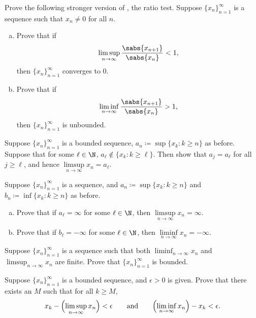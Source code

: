 \begin{exercise} \label{exercise:strongerratiotest2}
Prove the following stronger version of , the ratio
test.
Suppose $\{ x_n \}_{n=1}^\infty$ is a sequence such that $x_n \not= 0$ for all
$n$.
\begin{enumerate}[a)]
\item
Prove that if
\begin{equation*}
\limsup_{n \to \infty} \frac{\sabs{x_{n+1}}}{\sabs{x_n}} < 1 ,
\end{equation*}
then $\{ x_n \}_{n=1}^\infty$ converges to $0$.
\item
Prove that if
\begin{equation*}
\liminf_{n \to \infty} \frac{\sabs{x_{n+1}}}{\sabs{x_n}} > 1 ,
\end{equation*}
then $\{ x_n \}_{n=1}^\infty$ is unbounded.
\end{enumerate}
\end{exercise}

\begin{exercise}
Suppose $\{ x_n \}_{n=1}^\infty$ is a bounded sequence, $a_n \coloneqq \sup \{ x_k : k \geq n \}$
as before.  Suppose that for some $\ell \in \N$,
$a_\ell \notin \{ x_k : k \geq \ell \}$.  Then show that $a_j = a_\ell$ for all $j \geq \ell$, and hence
$\limsup\limits_{n\to\infty} x_n = a_\ell$.
\end{exercise}

\begin{exercise}
Suppose $\{ x_n \}_{n=1}^\infty$ is a sequence,
and $a_n \coloneqq \sup \{ x_k : k \geq n \}$ and
$b_n \coloneqq \inf \{ x_k : k \geq n \}$ as before.
\begin{enumerate}[a)]
\item
Prove that if $a_\ell = \infty$ for some $\ell \in \N$, then 
$\limsup\limits_{n\to\infty} x_n = \infty$.
\item
Prove that if $b_\ell = -\infty$ for some $\ell \in \N$, then 
$\liminf\limits_{n\to\infty} x_n = -\infty$.
\end{enumerate}
\end{exercise}

\begin{exercise}
Suppose $\{ x_n \}_{n=1}^\infty$ is a sequence
such that both $\liminf_{n\to\infty} x_n$ and
$\limsup_{n\to\infty} x_n$  are finite.  Prove that $\{ x_n \}_{n=1}^\infty$ is bounded.
\end{exercise}

\begin{exercise}
Suppose $\{ x_n \}_{n=1}^\infty$ is a bounded sequence, and $\epsilon > 0$ is given.
Prove that there exists an $M$ such that for all $k \geq M$,
\begin{equation*}
x_k - \Bigl(\limsup_{n\to\infty} x_n\Bigr) < \epsilon \qquad \text{and} \qquad
\Bigl(\liminf_{n\to\infty} x_n\Bigr) - x_k < \epsilon .
\end{equation*}
\end{exercise}

